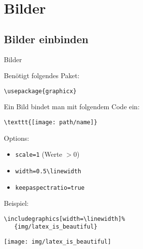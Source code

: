 \section{Bilder}
\subsection{Bilder einbinden}
\begin{frame}[fragile]{Bilder}
\begin{minipage}{0.6\linewidth}
Benötigt folgendes Paket:
\begin{lstlisting}[style=tex]
\usepackage{graphicx}
\end{lstlisting}

Ein Bild bindet man mit folgendem Code ein:

\begin{lstlisting}[style=tex]
\texttt{[image: path/name]}\end{lstlisting}

\pause
Options:
\begin{itemize}
\item \verb|scale=1| (Werte $>0$)
\item \verb|width=0.5\linewidth|
\item \verb|keepaspectratio=true|
\end{itemize}

\pause
Beispiel:
\begin{lstlisting}[style=tex]
\includegraphics[width=\linewidth]%
   {img/latex_is_beautiful}\end{lstlisting}
\end{minipage}
\hfill
\begin{minipage}{0.35\linewidth}
\pause
\texttt{[image: img/latex\_is\_beautiful]}
\end{minipage}
\end{frame}

